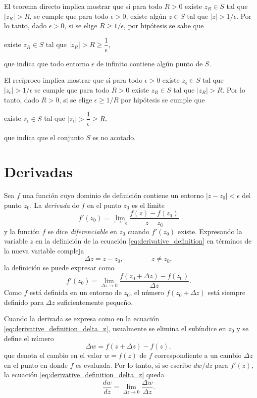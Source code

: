 \documentclass[a4paper]{report}
\begin{document}
El teorema directo implica mostrar que si para todo \(R>0\) existe \(z_R\in S\) tal que \(|z_R|>R\), se cumple que para todo \(\epsilon>0\), existe algún \(z\in S\) tal que \(|z|>1/\epsilon\). Por lo tanto, dado \(\epsilon>0\), si se elige \(R\geq1/\epsilon\), por hipótesis se sabe que
\begin{center}
 existe \(z_R\in S\) tal que \(|z_R|>R\geq\dfrac{1}{\epsilon}\),
\end{center}
que indica que todo entorno \(\epsilon\) de infinito contiene algún punto de \(S\).

El recíproco implica mostrar que si para todo \(\epsilon>0\) existe \(z_\epsilon\in S\) tal que \(|z_\epsilon|>1/\epsilon\) se cumple que para todo \(R>0\) existe \(z_R\in S\) tal que \(|z_R|>R\). Por lo tanto, dado \(R>0\), si se elige \(\epsilon\geq1/R\) por hipótesis se cumple que 
\begin{center}
 existe \(z_\epsilon\in S\) tal que \(|z_\epsilon|>\dfrac{1}{\epsilon}\geq R\),
\end{center}
que indica que el conjunto \(S\) es no acotado.

\section{Derivadas}\label{sec:derivatives}

Sea \(f\) una función cuyo dominio de definición contiene un entorno \(|z-z_0|<\epsilon\) del punto \(z_0\). La \emph{derivada} de \(f\) en el punto \(z_0\) es el límite
\begin{equation}\label{eq:derivative_definition}
 f'(z_0)=\lim_{z\to z_0}\frac{f(z)-f(z_0)}{z-z_0}
\end{equation}
y la función \(f\) se dice \emph{diferenciable} en \(z_0\) cuando \(f'(z_0)\) existe. Expresando la variable \(z\) en la definición de la ecuación \ref{eq:derivative_definition} en términos de la nueva variable compleja
\[
 \Delta z=z-z_0,\qquad\qquad z\neq z_0,
\]
la definición se puede expresar como
\begin{equation}\label{eq:derivative_definition_delta_z}
 f'(z_0)=\lim_{\Delta z\to 0}\frac{f(z_0+\Delta z)-f(z_0)}{\Delta z}. 
\end{equation}
Como \(f\) está definida en un entorno de \(z_0\), el número \(f(z_0+\Delta z)\) está siempre definido para \(\Delta z\) suficientemente pequeño.

Cuando la derivada se expresa como en la ecuación \ref{eq:derivative_definition_delta_z}, usualmente se elimina el subíndice en \(z_0\) y se define el número
\[
 \Delta w=f(z+\Delta z)-f(z),
\]
que denota el cambio en el valor \(w=f(z)\) de \(f\) correspondiente a un cambio \(\Delta z\) en el punto en donde \(f\) es evaluada. Por lo tanto, si se escribe \(dw/dz\) para \(f'(z)\), la ecuación \ref{eq:derivative_definition_delta_z} queda
\begin{equation}\label{eq:derivative_definition_delta_z_alt}
 \frac{dw}{dz}=\lim_{\Delta z\to 0}\frac{\Delta w}{\Delta z}.
\end{equation}
\end{document}
